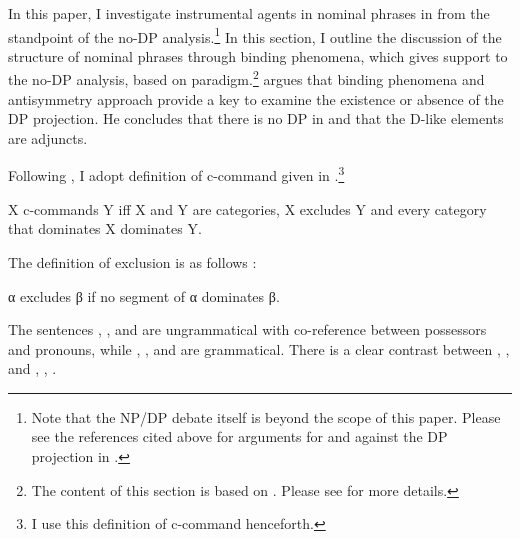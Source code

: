 \documentclass[output=paper,colorlinks,citecolor=brown,newtxmath]{langsci/langscibook}
\begin{document}
In this paper, I investigate instrumental agents in  nominal phrases in  from the standpoint of the no-DP analysis.\footnote{Note that the NP/DP debate itself is beyond the scope of this paper. Please see the references cited above for arguments for and against the DP projection in .}
In this section, I outline the discussion of the structure of nominal phrases through  binding phenomena, which gives support to the no-DP analysis, based on  paradigm.\footnote{The content of this section is based on \citet{Miyauchi2016}. Please see \citet{Miyauchi2016} for more details.}
\citet{despic2013} argues that binding phenomena and  antisymmetry approach provide a key to examine the existence or absence of the DP projection. He concludes that there is no DP in  and that the D-like elements are adjuncts.

Following \citet{despic2013}, I adopt  definition of c-command given in .\footnote{I use this definition of c-command henceforth.}

\begin{exe}
\ex\label{def}
X c-commands Y iff X and Y are categories, X excludes Y and every category that 	dominates X dominates Y.
\hfill \citep[16]{kayne1994}
\end{exe}

\noindent
The definition of exclusion is as follows :

\begin{exe}
\ex\label{exc} α excludes β if no segment of α dominates β.
\hfill \citep[9]{Chomsky1986barriers}
\end{exe}

\noindent
The  sentences , , and  are ungrammatical with co-reference between possessors and pronouns, while , , and  are grammatical. There is a clear contrast between , ,  and , , .

\begin{exe}\ex\label{bin}
\begin{xlist}
\end{xlist}
\end{exe}
\end{document}
